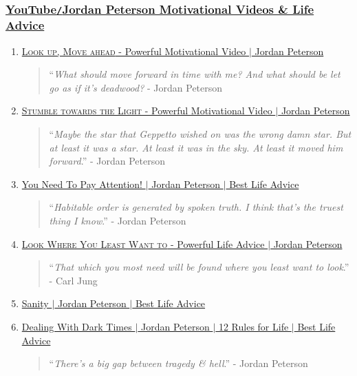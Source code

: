 \documentclass{article}
\begin{document}
\subsubsection{\href{https://www.youtube.com/playlist?list=PLi3n6z1voQ1arCpQ89izFMwk7lsFrFnq0}{YouTube\texttt{/}Jordan Peterson Motivational Videos \& Life Advice}}
\begin{enumerate}
	\item \href{https://www.youtube.com/watch?v=MUmKnW1j2Xs}{\textsc{Look up, Move ahead} - Powerful Motivational Video $|$ Jordan Peterson}    
	\begin{quotation}
		``{\it What should move forward in time with me? And what should be let go as if it's deadwood?} - Jordan Peterson
	\end{quotation}
	\item \href{https://www.youtube.com/watch?v=PrIrZRd0pGE}{\textsc{Stumble towards the Light} - Powerful Motivational Video $|$ Jordan Peterson}    
	\begin{quotation}
		``{\it Maybe the star that Geppetto wished on was the wrong damn star. But at least it was a star. At least it was in the sky. At least it moved him forward}.'' - Jordan Peterson
	\end{quotation}
	\item \href{https://www.youtube.com/watch?v=L0FCwYKkZ4o}{You Need To Pay Attention! $|$ Jordan Peterson $|$ Best Life Advice}    
	\begin{quotation}
		``{\it Habitable order is generated by spoken truth. I think that's the truest thing I know}.'' - Jordan Peterson
	\end{quotation}
	\item \href{https://www.youtube.com/watch?v=LjIAzKo62MQ}{\textsc{Look Where You Least Want to} - Powerful Life Advice $|$ Jordan Peterson}    
	\begin{quotation}
		``{\it That which you most need will be found where you least want to look}.'' - Carl Jung
	\end{quotation}
	\item \href{https://www.youtube.com/watch?v=_g6Aqrl3fFM}{Sanity $|$ Jordan Peterson $|$ Best Life Advice}
	\item \href{https://www.youtube.com/watch?v=3EGIlQyEwvE}{Dealing With Dark Times $|$ Jordan Peterson $|$ 12 Rules for Life $|$ Best Life Advice}    
	\begin{quotation}
		``{\it There's a big gap between tragedy \& hell}.'' - Jordan Peterson
	\end{quotation}

\end{enumerate}
\end{document}
